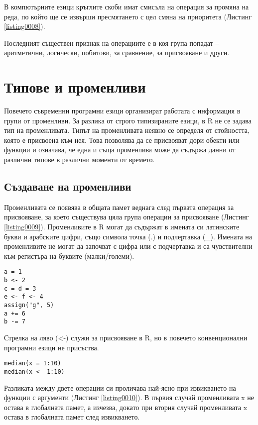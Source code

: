 В компютърните езици кръглите скоби имат смисъла на операция за промяна на реда, по който ще се извърши пресмятането с цел смяна на приоритета (Листинг \ref{listing0008}).

Последният съществен признак на операциите е в коя група попадат – аритметични, логически, побитови, за сравнение, за присвояване и други.

\section{Типове и променливи}

Повечето съвременни програмни езици организират работата с информация в групи от променливи. За разлика от строго типизираните езици, в R не се задава тип на променливата. Типът на променливата неявно се определя от стойността, която е присвоена към нея. Това позволява да се присвояват дори обекти или функции и означава, че една и съща променлива може да съдържа данни от различни типове в различни моменти от времето.

\subsection{Създаване на променливи}

Променливата се появява в общата памет веднага след първата операция за присвояване, за което съществува цяла група операции за присвояване (Листинг \ref{listing0009}). Променливите в R могат да съдържат в имената си латинските букви и арабските цифри, също символа точка (.) и подчертавка (\_). Имената на променливите не могат да започват с цифра или с подчертавка и са чувствителни към регистъра на буквите (малки/големи).

\begin{lstlisting}[caption=Операции за присвояване, label=listing0009]
a = 1
b <- 2
c = d = 3
e <- f <- 4
assign("g", 5)
a += 6
b -= 7
\end{lstlisting}

Стрелка на ляво (<-) служи за присвояване в R, но в повечето конвенционални програмни езици не присъства.

\begin{lstlisting}[caption=Алтернативи за операцията присвояване, label=listing0010]
median(x = 1:10)
median(x <- 1:10)
\end{lstlisting}

Разликата между двете операции си проличава най-ясно при извикването на функции с аргументи (Листинг \ref{listing0010}). В първия случай променливата x не остава в глобалната памет, а изчезва, докато при втория случай променливата x остава в глобалната памет след извикването.

